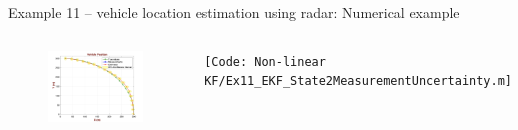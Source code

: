 \begin{frame}{Example 11 – vehicle location estimation using radar: Numerical example}
\begin{columns}
\begin{figure}
    \centering
    \includegraphics[width=1\linewidth]{Figures//Part3/ex11_Position_Zoom_Cureved.png}
\end{figure}

\texttt{\tiny [Code: Non-linear KF/Ex11\_EKF\_State2MeasurementUncertainty.m]}
\end{columns}
\end{frame}

